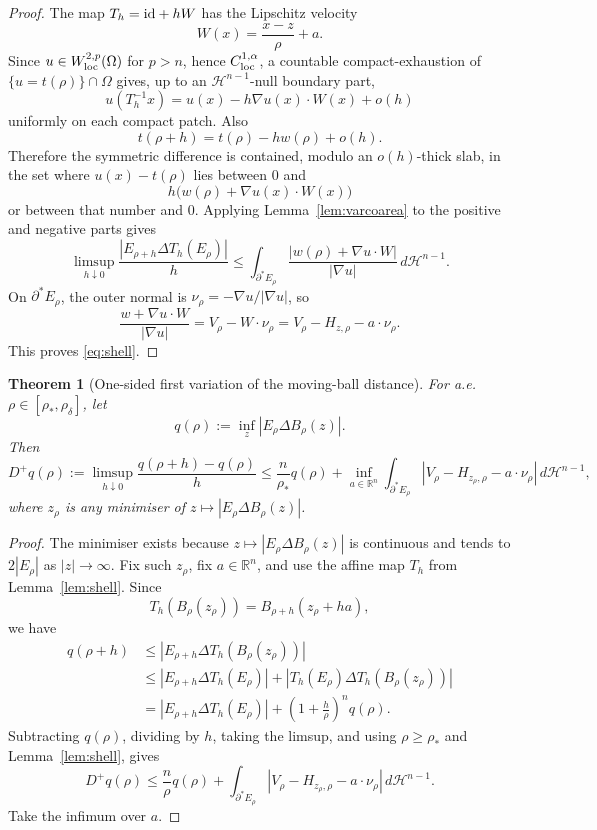 \documentclass[11pt]{article}
\newtheorem{theorem}{Theorem}[section]
\theoremstyle{definition}
\newcommand{\R}{\mathbb R}
\newcommand{\HH}{\mathcal H}
\newcommand{\rstar}{\rho_*}
\newcommand{\rdel}{\rho_\delta}
\newcommand{\wt}{w}
\begin{document}
\begin{proof}
The map \(T_h={\rm id}+hW\) has the Lipschitz velocity
\[
   W(x)=\frac{x-z}{\rho}+a.
\]
Since \(u\in W^{2,p}_{\rm loc}(\Omega)\) for \(p>n\), hence
\(C^{1,\alpha}_{\rm loc}\), a countable compact-exhaustion of
\(\{u=t(\rho)\}\cap\Omega\) gives, up to an \(\HH^{n-1}\)-null boundary part,
\[
   u(T_h^{-1}x)
   =
   u(x)-h\nabla u(x)\cdot W(x)+o(h)
\]
uniformly on each compact patch.  Also
\[
   t(\rho+h)=t(\rho)-h\wt(\rho)+o(h).
\]
Therefore the symmetric difference is contained, modulo an \(o(h)\)-thick
slab, in the set where \(u(x)-t(\rho)\) lies between \(0\) and
\[
   h\bigl(\wt(\rho)+\nabla u(x)\cdot W(x)\bigr)
\]
or between that number and \(0\).  Applying Lemma~\ref{lem:varcoarea} to
the positive and negative parts gives
\[
   \limsup_{h\downarrow0}
   \frac{|E_{\rho+h}\Delta T_h(E_\rho)|}{h}
   \le
   \int_{\partial^*E_\rho}
   \frac{|\wt(\rho)+\nabla u\cdot W|}{|\nabla u|}\,d\HH^{n-1}.
\]
On \(\partial^*E_\rho\), the outer normal is
\(\nu_\rho=-\nabla u/|\nabla u|\), so
\[
   \frac{\wt+\nabla u\cdot W}{|\nabla u|}
   =
   V_\rho-W\cdot\nu_\rho
   =
   V_\rho-H_{z,\rho}-a\cdot\nu_\rho .
\]
This proves \eqref{eq:shell}.
\end{proof}

\begin{theorem}[One-sided first variation of the moving-ball distance]
\label{thm:qplus}
For a.e. \(\rho\in[\rstar,\rdel]\), let
\[
   q(\rho):=\inf_z |E_\rho\Delta B_\rho(z)|.
\]
Then
\begin{equation}\label{eq:qplus}
   D^+q(\rho):=
   \limsup_{h\downarrow0}\frac{q(\rho+h)-q(\rho)}{h}
   \le
   \frac{n}{\rstar}q(\rho)
   +
   \inf_{a\in\R^n}\int_{\partial^*E_\rho}
      |V_\rho-H_{z_\rho,\rho}-a\cdot\nu_\rho|\,d\HH^{n-1},
\end{equation}
where \(z_\rho\) is any minimiser of \(z\mapsto |E_\rho\Delta B_\rho(z)|\).
\end{theorem}

\begin{proof}
The minimiser exists because \(z\mapsto |E_\rho\Delta B_\rho(z)|\) is
continuous and tends to \(2|E_\rho|\) as \(|z|\to\infty\).  Fix such
\(z_\rho\), fix \(a\in\R^n\), and use the affine map \(T_h\) from
Lemma~\ref{lem:shell}.  Since
\[
   T_h(B_\rho(z_\rho))=B_{\rho+h}(z_\rho+ha),
\]
we have
\[
\begin{aligned}
   q(\rho+h)
   &\le |E_{\rho+h}\Delta T_h(B_\rho(z_\rho))|\\
   &\le |E_{\rho+h}\Delta T_h(E_\rho)|
      +|T_h(E_\rho)\Delta T_h(B_\rho(z_\rho))|\\
   &= |E_{\rho+h}\Delta T_h(E_\rho)|
      +\left(1+\frac{h}{\rho}\right)^n q(\rho).
\end{aligned}
\]
Subtracting \(q(\rho)\), dividing by \(h\), taking the limsup, and using
\(\rho\ge\rstar\) and Lemma~\ref{lem:shell}, gives
\[
   D^+q(\rho)
   \le \frac{n}{\rho}q(\rho)
   +
   \int_{\partial^*E_\rho}|V_\rho-H_{z_\rho,\rho}-a\cdot\nu_\rho|\,d\HH^{n-1}.
\]
Take the infimum over \(a\).
\end{proof}
\end{document}
